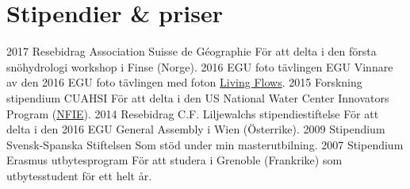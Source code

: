 \ifswedish
  \section{Stipendier \& priser}
    \position
      {2017}
      {Resebidrag}
      {Association Suisse de Géographie}
      {För att delta i den första snöhydrologi workshop i Finse (Norge).}
    \position
      {2016}
      {EGU foto tävlingen}
      {EGU}
      {Vinnare av den 2016 EGU foto tävlingen med foton \href{https://blogs.egu.eu/geolog/2016/08/29/imaggeo-on-mondays-living-flows/}{Living Flows}.}
    \position
      {2015}
      {Forskning stipendium}
      {CUAHSI}
      {För att delta i den US National Water Center Innovators Program  (\href{https://www.cuahsi.org/education/summerinstitute/}{NFIE}).}
    \position
      {2014}
      {Resebidrag}
      {C.F. Liljewalchs stipendiestiftelse}
      {För att delta i den 2016 EGU General Assembly i Wien (Österrike).}
    \position
      {2009}
      {Stipendium}
      {Svensk-Spanska Stiftelsen}
      {Som stöd under min masterutbilning.}
    \position
      {2007}
      {Stipendium}
      {Erasmus utbytesprogram}
      {För att studera i Grenoble (Frankrike) som utbytesstudent för ett helt år.}
\else
